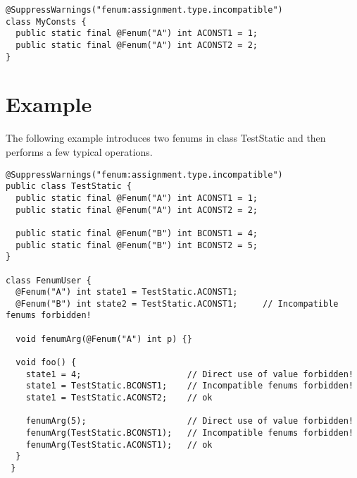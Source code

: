 \begin{Verbatim}
@SuppressWarnings("fenum:assignment.type.incompatible")
class MyConsts {
  public static final @Fenum("A") int ACONST1 = 1;
  public static final @Fenum("A") int ACONST2 = 2;  
}
\end{Verbatim}



\section{Example}

The following example introduces two fenums in class TestStatic
and then performs a few typical operations.

\begin{Verbatim}
@SuppressWarnings("fenum:assignment.type.incompatible")
public class TestStatic {
  public static final @Fenum("A") int ACONST1 = 1;
  public static final @Fenum("A") int ACONST2 = 2;

  public static final @Fenum("B") int BCONST1 = 4;
  public static final @Fenum("B") int BCONST2 = 5;
}

class FenumUser {
  @Fenum("A") int state1 = TestStatic.ACONST1;
  @Fenum("B") int state2 = TestStatic.ACONST1;     // Incompatible fenums forbidden!

  void fenumArg(@Fenum("A") int p) {}
	
  void foo() {
    state1 = 4;                     // Direct use of value forbidden!
    state1 = TestStatic.BCONST1;    // Incompatible fenums forbidden!
    state1 = TestStatic.ACONST2;    // ok

    fenumArg(5);                    // Direct use of value forbidden!
    fenumArg(TestStatic.BCONST1);   // Incompatible fenums forbidden!
    fenumArg(TestStatic.ACONST1);   // ok
  }
 }
\end{Verbatim}

